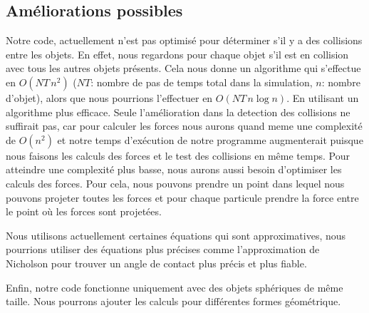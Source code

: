     \subsection{Améliorations possibles}
        Notre code, actuellement n'est pas optimisé pour déterminer s'il y a des collisions entre les objets. En effet, nous regardons pour chaque objet s'il est en collision avec tous les autres objets présents. Cela nous donne un algorithme qui s'effectue en $O(NT\,n^2)$ ($NT$: nombre de pas de temps total dans la simulation, $n$: nombre d'objet), alors que nous pourrions l'effectuer en $O(NT\, n\log n)$. En utilisant un algorithme plus efficace. Seule l'amélioration dans la detection des collisions ne suffirait pas, car pour calculer les forces nous aurons quand meme une complexité de  $O(n^2)$ et notre temps d'exécution de notre programme augmenterait puisque nous faisons les calculs des forces et le test des collisions en même temps. Pour atteindre une complexité plus basse, nous aurons aussi besoin d'optimiser les calculs des forces. Pour cela, nous pouvons prendre un point dans lequel nous pouvons projeter toutes les forces et pour chaque particule prendre la force entre le point où les forces sont projetées.

        Nous utilisons actuellement certaines équations qui sont approximatives, nous pourrions utiliser des équations plus précises comme l'approximation de Nicholson pour trouver un angle de contact plus précis et plus fiable.

        Enfin, notre code fonctionne uniquement avec des objets sphériques de même taille. Nous pourrons ajouter les calculs pour différentes formes géométrique.
\newpage
\onecolumn

